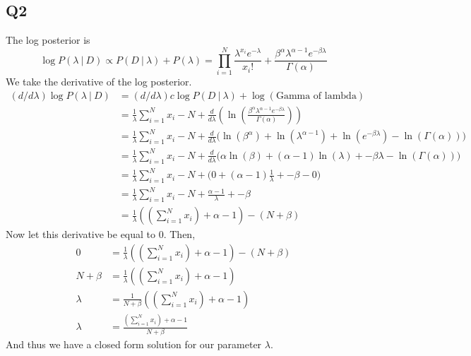 \documentclass{article}
\theoremstyle{definition}
\begin{document}
    \subsection{Q2}
        The log posterior is 
        \[
            \log P(\lambda \ | \ D) \propto P(D \ | \ \lambda) + P(\lambda) = \prod_{i = 1}^N \frac{\lambda^{x_i}e^{-\lambda}}{x_i!} + \frac{\beta^{\alpha}\lambda^{\alpha - 1}e^{-\beta\lambda}}{\Gamma(\alpha)}
        \]
        We take the derivative of the log posterior.
        \begin{align*}
            (d/d\lambda) \log P(\lambda \ | \ D) &= (d / d\lambda) c\log P(D \ | \ \lambda) + \log \left(\text{Gamma of lambda}\right) \\
            &= \frac{1}{\lambda}\sum_{i=1}^N x_i - N + \frac{d}{d\lambda }\left( \ln \left( \frac{\beta^\alpha \lambda^{\alpha - 1}e^{-\beta\lambda}}{\Gamma(\alpha)}\right) \right) \\
            &= \frac{1}{\lambda}\sum_{i=1}^N x_i - N + \frac{d}{d\lambda }\bigg( 
                \ln(\beta^\alpha) + \ln(\lambda^{\alpha-1}) + \ln(e^{-\beta\lambda}) - \ln(\Gamma(\alpha))
            \bigg)\\
            &= \frac{1}{\lambda}\sum_{i=1}^N x_i - N + \frac{d}{d\lambda }\bigg( 
                \alpha \ln(\beta) + (\alpha - 1)\ln(\lambda) + -\beta\lambda - \ln(\Gamma(\alpha))
            \bigg)\\
            &= \frac{1}{\lambda}\sum_{i=1}^N x_i - N + \bigg( 
                0 + (\alpha - 1)\frac{1}{\lambda} + -\beta - 0
            \bigg) \\
            &= \frac{1}{\lambda}\sum_{i=1}^N x_i - N + \frac{\alpha - 1}{\lambda} + -\beta \\
            &= \frac{1}{\lambda} \left( 
                \left(\sum_{i=1}^N x_i\right)  + \alpha - 1 
            \right)
            - (N + \beta)
        \end{align*}
        Now let this derivative be equal to 0. Then,
        \begin{align*}
            0 & = \frac{1}{\lambda} \left( 
                \left(\sum_{i=1}^N x_i\right)  + \alpha - 1 
            \right)
            - (N + \beta) \\
            N + \beta &= \frac{1}{\lambda} \left( 
                \left(\sum_{i=1}^N x_i\right)  + \alpha - 1 
            \right) \\
            \lambda &= \frac{1}{N + \beta} \left( 
                \left(\sum_{i=1}^N x_i\right)  + \alpha - 1 
            \right) \\
            \lambda &= \frac{\left(\sum_{i=1}^N x_i\right) + \alpha - 1}{N + \beta}
        \end{align*}
        And thus we have a closed form solution for our parameter $\lambda$.
\end{document}
